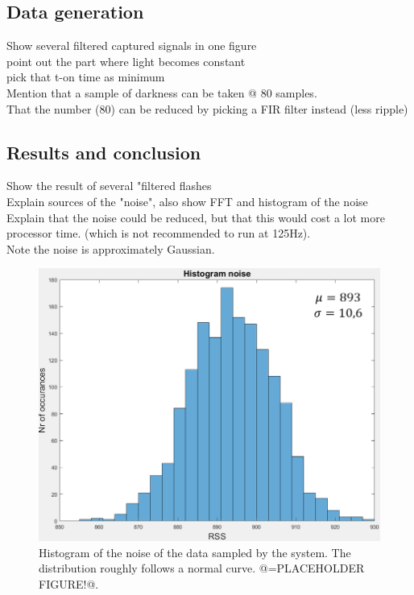 \subsection{Data generation}
\label{sec:Data_generation}
Show several filtered captured signals in one figure\\
point out the part where light becomes constant\\
pick that t-on time as minimum\\
Mention that a sample of darkness can be taken @ 80 samples.\\
That the number (80) can be reduced by picking a FIR filter instead (less ripple)\\

\subsection{Results and conclusion}
\label{sec:conclusion}
Show the result of several "filtered flashes\\
Explain sources of the "noise", also show FFT and histogram of the noise\\
Explain that the noise could be reduced, but that this would cost a lot more processor time. (which is not recommended to run at 125Hz).\\
Note the noise is approximately Gaussian.

\begin{figure}[!h]
	\includegraphics[width=\textwidth]{pics/histogram_noise_placeholder.png}
	\caption{Histogram of the noise of the data sampled by the system. The distribution roughly follows a normal curve. @=PLACEHOLDER FIGURE!@.}
	\label{fig:histogram_noise}
\end{figure}
